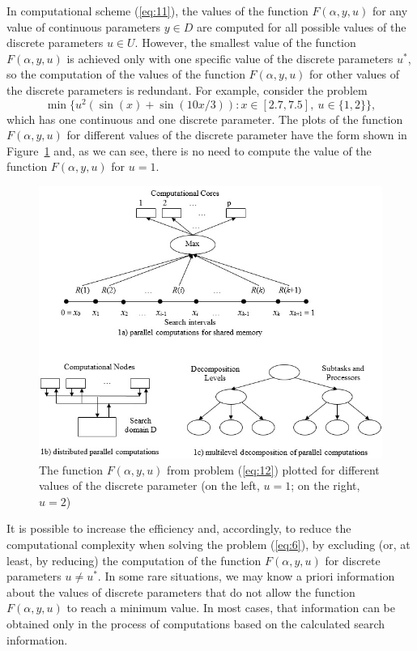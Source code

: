 \documentclass{svproc}
\begin{document}
In computational scheme (\ref{eq:11}), the values of the function $F(\alpha,y,u)$ for any value of continuous parameters $y \in D$ are computed for all possible values of the discrete parameters $u \in U$. However, the smallest value of the function $F(\alpha,y,u)$ is achieved only with one specific value of the discrete parameters $u^*$, so the computation of the values of the function $F(\alpha,y,u)$ for other values of the discrete parameters is redundant. For example, consider the problem
\begin{equation}\label{eq:12}
 \min\{u^2(\sin(x)+\sin(10x/3)):x\in[2.7,7.5],\ u\in \{1,2\}\},
\end{equation}
which has one continuous and one discrete parameter. The plots of the  function $F(\alpha,y,u)$ for different values of the discrete parameter have the form shown in Figure~\ref{fig:1} and, as we can see, there is no need to compute the value of the function $F(\alpha,y,u)$ for $u=1$.

\begin{figure}
  \centering
  \includegraphics[width=0.9\linewidth]{fig1}
  \caption{The function $F(\alpha,y,u)$ from problem (\ref{eq:12}) plotted for different values of the discrete parameter (on the left, $u=1$;  on the right, $u=2$)}
  \label{fig:1}
\end{figure}

It is possible to increase the efficiency and, accordingly, to reduce the computational complexity when solving the problem (\ref{eq:6}), by excluding (or, at least, by reducing) the computation of the function $F(\alpha,y,u)$ for discrete parameters $u \neq u^*$. In some rare situations,  we may know a priori information about the values of discrete parameters that do not allow the function $F(\alpha,y,u)$ to reach a minimum value. In most cases, that information can be obtained only in the process of computations based on the calculated search information.
\end{document}
